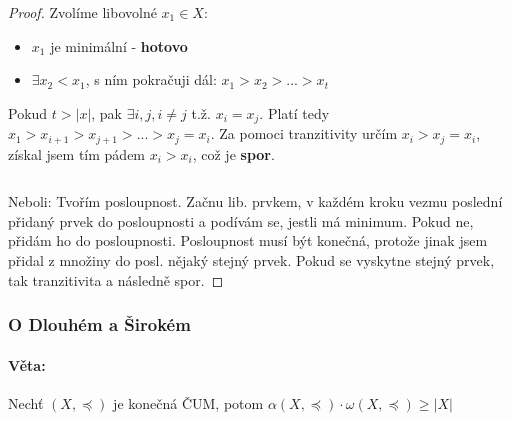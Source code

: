 \documentclass[10pt,a4paper]{article}
\begin{document}
\begin{proof}
    Zvolíme libovolné $x_1 \in X$: 
    \begin{itemize}
        \item $x_1$ je minimální - \textbf{hotovo}
        \item $\exists x_2 < x_1$, s ním pokračuji dál: $x_1 > x_2 > ... > x_t$
    \end{itemize}

    Pokud $t > |x|$, pak $\exists i,j, i\neq j$ t.ž. $x_i = x_j$. Platí tedy $x_1 > x_{i+1} > x_{j+1} > ... > x_j = x_i$. Za pomoci tranzitivity určím $x_i > x_j = x_i$, získal jsem tím pádem $ x_i > x_i$, což je \textbf{spor}.

    $ $

    Neboli: Tvořím posloupnost. Začnu lib. prvkem, v každém kroku vezmu poslední přidaný prvek do posloupnosti a podívám se, jestli má minimum. Pokud ne, přidám ho do posloupnosti. Posloupnost musí být konečná, protože jinak jsem přidal z množiny do posl. nějaký stejný prvek. Pokud se vyskytne stejný prvek, tak tranzitivita a následně spor.
\end{proof}

\subsubsection{O Dlouhém a Širokém}
\paragraph*{Věta: } Nechť $(X, \preceq)$ je konečná ČUM, potom $\alpha (X, \preceq) \cdot \omega (X, \preceq) \geq |X|$
\end{document}
